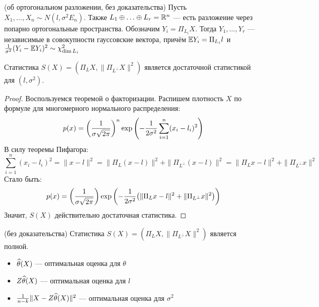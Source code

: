 \begin{theorem} (об ортогональном разложении, без доказательства)
	Пусть $X_1, \ldots, X_n \sim N(l, \sigma^2 E_n)$. Также $L_1 \oplus \ldots \oplus L_r = \mathbb{R}^n$ --- есть разложение через попарно ортогональные пространства. Обозначим $Y_i = \Pi_{L_i} X$. Тогда $Y_1, \ldots, Y_r$ --- независимые в совокупности гауссовские вектора, причём $\mathbb{E} Y_i = \Pi_{L_i} l$ и $\frac{1}{\sigma^2}(Y_i - \mathbb{E} Y_i)^2 \sim \chi_{\dim L_i}^2$
\end{theorem}

\begin{proposition}
	Статистика $S(X) = (\Pi_L X, \|\Pi_{L^\bot} X\|^2)$ является достаточной статистикой для $(l, \sigma^2)$.
\end{proposition}

\begin{proof}
	Воспользуемся теоремой о факторизации. Распишем плотность $X$ по формуле для многомерного нормального распределения:
	\[
		p(x) = \left(\frac{1}{\sigma\sqrt{2\pi}}\right)^n\exp\left(-\frac{1}{2\sigma^2}\sum_{i = 1}^n (x_i - l_i)^2\right)
	\]
	В силу теоремы Пифагора:
	\[
		\sum_{i = 1}^n (x_i - l_i)^2 = \|x - l\|^2 = \|\Pi_L (x - l)\|^2 + \|\Pi_{L^\bot} (x - l)\|^2 = \|\Pi_L x - l\|^2 + \|\Pi_{L^\bot} x\|^2
 	\]
 	Стало быть:
	\[
	 	p(x) = \left(\frac{1}{\sigma\sqrt{2\pi}}\right)\exp\left(-\frac{1}{2\sigma^2}\big(\|\Pi_L x - l\|^2 + \|\Pi_{L^\bot} x\|^2\big)\right)
	\]
	Значит, $S(X)$ действительно достаточная статистика.
\end{proof}

\begin{theorem} (без доказательства)
	Статистика $S(X) = (\Pi_L X, \|\Pi_{L^\bot} X\|^2)$ является полной.
\end{theorem}

\begin{corollary}
	\begin{itemize}
		\item $\widehat{\theta}(X)$ --- оптимальная оценка для $\theta$
		
		\item $Z\widehat{\theta}(X)$ --- оптимальная оценка для $l$
		
		\item $\frac{1}{n - k}\|X - Z\widehat{\theta}(X)\|^2$ --- оптимальная оценка для $\sigma^2$
	\end{itemize}
\end{corollary}

